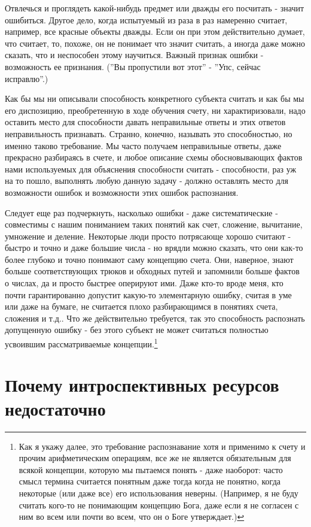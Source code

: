 \documentclass[12pt]{book}
\begin{document}
Отвлечься и проглядеть какой-нибудь предмет или дважды его посчитать - значит ошибиться. Другое дело, когда испытуемый из раза в раз намеренно считает, например, все красные объекты дважды. Если он при этом действительно думает, что считает, то, похоже, он не понимает что значит считать, а иногда даже можно сказать, что и неспособен этому научиться. Важный признак ошибки - возможность ее признания. (''Вы пропустили вот этот'' - ''Упс, сейчас исправлю''.)

Как бы мы ни описывали способность конкретного субъекта считать и как бы мы его диспозицию, преобретенную в ходе обучения счету, ни характиризовали, надо оставить место для способности давать неправильные ответы и этих ответов неправильность признавать. Странно, конечно, называть это способностью, но именно таково требование. Мы часто получаем неправильные ответы, даже прекрасно разбираясь в счете, и любое описание схемы обосновывающих фактов нами используемых для объяснения способности считать - способности, раз уж на то пошло, выполнять любую данную задачу - должно оставлять место для возможности ошибок и возможности этих ошибок распознания.

Следует еще раз подчеркнуть, насколько ошибки - даже систематические - совместимы с нашим пониманием таких понятий как счет, сложение, вычитание, умножение и деление. Некоторые люди просто потрясающе хорошо считают - быстро и точно и даже большие числа - но врядли можно сказать, что они как-то более глубоко и точно понимают саму концепцию счета. Они, наверное, знают больше соответствующих трюков и обходных путей и запомнили больше фактов о числах, да и просто быстрее оперируют ими. Даже кто-то вроде меня, кто почти гарантированно допустит какую-то элементарную ошибку, считая в уме или даже на бумаге, не считается плохо разбирающимся в понятиях счета, сложения и т.д.. Что же действительно требуется, так это способность распознать допущенную ошибку - без этого субъект не может считаться полностью усвоившим рассматриваемые концепции.\footnote{Как я укажу далее, это требование распознавание хотя и применимо к счету и прочим арифметическим операциям, все же не является обязательным для всякой концепции, которую мы пытаемся понять - даже наоборот: часто смысл термина считается понятным даже тогда когда не понятно, когда некоторые (или даже все) его использования неверны. (Например, я не буду считать кого-то не понимающим концепцию Бога, даже если я не согласен с ним во всем или почти во всем, что он о Боге утверждает.)}

\section{Почему интроспективных ресурсов недостаточно}
\end{document}
